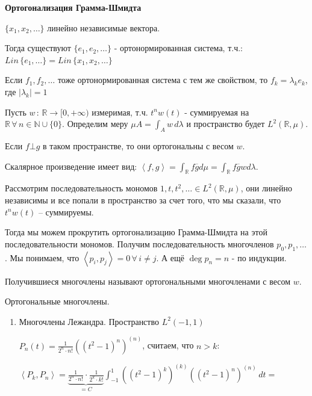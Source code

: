 \begin{remark}
    \textbf{Ортогонализация Грамма-Шмидта}

    $\{ x_1, x_2, \ldots \}$ линейно независимые вектора.

    Тогда существуют $\{ e_1, e_2, \ldots  \}$ - ортонормированная система, т.ч.:
    $Lin \, \{ e_1, \ldots \} = Lin \, \{ x_1, x_2, \ldots \}$

    Если $f_1, f_2, \ldots$ тоже ортонормированная система с тем же свойством, то 
    $f_k = \lambda_k e_k$, где $|\lambda_k| = 1$
    
    \begin{remark}
        Пусть $w \, : \, \mathbb{R} \rightarrow [0, +\infty)$ измеримая,
        т.ч. $t^n w(t)$ - суммируемая на $\mathbb{R} \, \forall \, n \in \mathbb{N} \cup \{0\}$. Определим меру $\mu A = \int_A w \, d\lambda$ и пространство будет $L^2 (\mathbb{R}, \mu)$.

        Если $f \bot g$ в таком пространстве, то они ортогональны с весом $w$.

        Скалярное произведение имеет вид: $\left< f, g \right> = \int_{\mathbb{R}} f \overline{g} d \mu = \int_{\mathbb{R}} f \overline{g} w d \lambda$.

        Рассмотрим последовательность мономов $1, t, t^2, \ldots \in L^2 (\mathbb{R}, \mu)$, они линейно независимы и все попали в пространство за счет того, что мы сказали, что $t^n w(t)$ -- суммируемы.

        Тогда мы можем прокрутить ортогонализацию Грамма-Шмидта на этой последовательности мономов. Получим последовательность многочленов $p_0, p_1, \ldots$.
        Мы понимаем, что $\left < p_i, p_j \right > = 0 \, \forall \, i \neq j$. А ещё $\deg p_n = n$ - по индукции.

        Получившиеся многочлены называют ортогональными многочленами с весом $w$.

        \begin{example}
            Ортогональные многочлены.

            \begin{enumerate}
                \item {
                    Многочлены Лежандра. Пространство $L^2 (-1, 1)$

                    $P_n (t) = \frac{1}{2^n \cdot n!} ((t^2 - 1)^n)^{(n)}$, считаем, что $n > k$:

                    $\left < P_k, P_n \right > = \underbrace{\frac{1}{2^n \cdot n!} \cdot \frac{1}{2^k \cdot k!}}_{=C} \int_{-1}^1 ((t^2 - 1)^k)^{(k)} ((t^2 - 1)^n)^{(n)} \, dt =$
                    
}
\end{enumerate}
\end{example}
\end{remark}
\end{remark}
